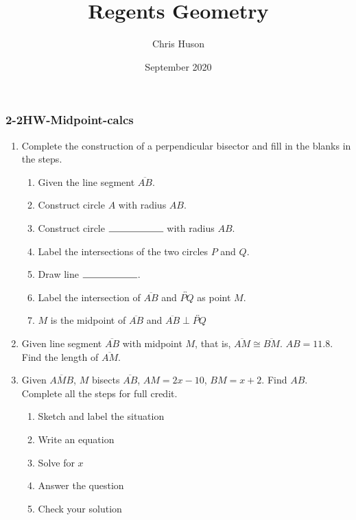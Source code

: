 \documentclass[12pt, twoside]{article}
\title{Regents Geometry}
\author{Chris Huson}
\date{September 2020}
\begin{document}
\subsubsection*{2-2HW-Midpoint-calcs}
\begin{enumerate}
\item Complete the construction of a perpendicular bisector and fill in the blanks in the steps.
      \begin{enumerate}
        \item Given the line segment $\overline{AB}$.
        \item Construct circle $A$ with radius $AB$.
        \bigskip
        \item Construct circle $\rule{2cm}{0.15mm}$  with radius $AB$. 
        \item Label the intersections of the two circles $P$ and $Q$. \bigskip
        \item Draw line $\rule{2cm}{0.15mm}$.
        \item Label the intersection of $\overline{AB}$ and $\overleftrightarrow{PQ}$ as point $M$.
        \item $M$ is the midpoint of $\overline{AB}$ and $\overline{AB} \perp \overleftrightarrow{PQ}$
      \end{enumerate}
      \vspace{7cm}
      \begin{center}
      \end{center}

\newpage

\item Given line segment $\overline{AB}$ with midpoint $M$, that is, $\overline{AM} \cong \overline{BM}$. $AB=11.8$. Find the length of $\overline{AM}$.\\[0.75cm]
\vspace{3cm}

\item Given $\overline{AMB}$, $M$ bisects $\overline{AB}$, $AM=2x-10$, $BM=x+2$. Find ${AB}$.\\
Complete all the steps for full credit. \smallskip
  \begin{enumerate}
    \item Sketch and label the situation
    \item Write an equation
    \item Solve for $x$
    \item Answer the question
    \item Check your solution
  \end{enumerate}


\end{enumerate}
\end{document}
